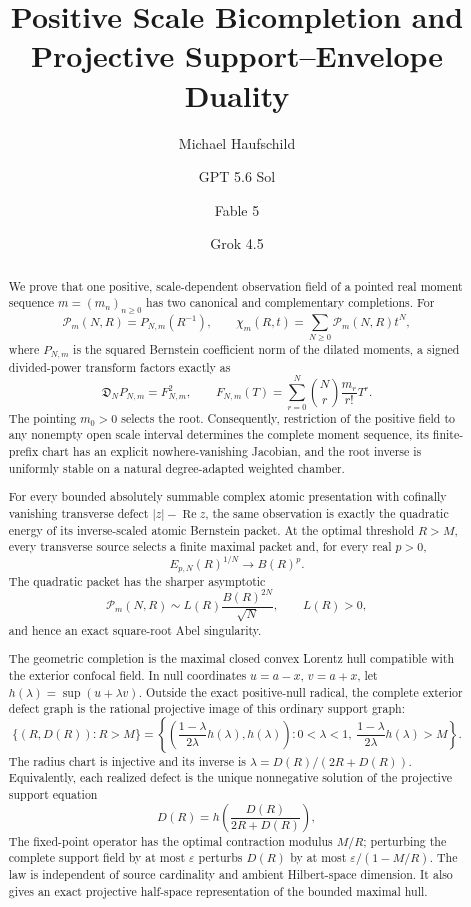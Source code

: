 \documentclass[11pt]{article}
\title{Positive Scale Bicompletion and Projective Support--Envelope Duality}
\author{Michael Haufschild \and GPT 5.6 Sol \and Fable 5 \and Grok 4.5}
\date{}
\theoremstyle{remark}
\newcommand{\Rea}{\operatorname{Re}}
\begin{document}
\maketitle

\begin{abstract}
We prove that one positive, scale-dependent observation field of a pointed real moment sequence
$m=(m_n)_{n\geq0}$ has two canonical and complementary completions.  For
\[
  \mathcal P_m(N,R)=P_{N,m}(R^{-1}),\qquad
  \chi_m(R,t)=\sum_{N\geq0}\mathcal P_m(N,R)t^N,
\]
where $P_{N,m}$ is the squared Bernstein coefficient norm of the dilated moments, a signed
divided-power transform factors exactly as
\[
 \mathfrak D_NP_{N,m}=F_{N,m}^{2},\qquad
 F_{N,m}(T)=\sum_{r=0}^N\binom Nr\frac{m_r}{r!}T^r.
\]
The pointing $m_0>0$ selects the root.  Consequently, restriction of the positive field to any
nonempty open scale interval determines the complete moment sequence, its finite-prefix chart
has an explicit nowhere-vanishing Jacobian, and the root inverse is uniformly stable on a natural
degree-adapted weighted chamber.

For every bounded absolutely summable complex atomic presentation with cofinally vanishing
transverse defect $|z|-\Rea z$, the same observation is exactly the quadratic energy of its
inverse-scaled atomic Bernstein packet.  At the optimal threshold $R>M$, every transverse source
selects a finite maximal packet and, for every real $p>0$,
\[
 E_{p,N}(R)^{1/N}\longrightarrow B(R)^p.
\]
The quadratic packet has the sharper asymptotic
\[
 \mathcal P_m(N,R)\sim L(R)\frac{B(R)^{2N}}{\sqrt N},\qquad L(R)>0,
\]
and hence an exact square-root Abel singularity.

The geometric completion is the maximal closed convex Lorentz hull compatible with the exterior
confocal field.  In null coordinates $u=a-x$, $v=a+x$, let
$h(\lambda)=\sup(u+\lambda v)$.  Outside the exact positive-null radical, the complete exterior
defect graph is the rational projective image of this ordinary support graph:
\[
 \{(R,D(R)):R>M\}
 =\left\{\left(\frac{1-\lambda}{2\lambda}h(\lambda),h(\lambda)\right):
 0<\lambda<1,\ \frac{1-\lambda}{2\lambda}h(\lambda)>M\right\}.
\]
The radius chart is injective and its inverse is
$\lambda=D(R)/(2R+D(R))$.  Equivalently, each realized defect is the unique nonnegative solution
of the projective support equation
\[
 D(R)=h\!\left(\frac{D(R)}{2R+D(R)}\right),
\]
The fixed-point operator has the optimal contraction modulus $M/R$; perturbing the complete
support field by at most $\varepsilon$ perturbs $D(R)$ by at most
$\varepsilon/(1-M/R)$.  The law is independent of source cardinality and ambient Hilbert-space
dimension.  It also gives an exact projective half-space representation of the bounded maximal
hull.


\end{abstract}
\end{document}
